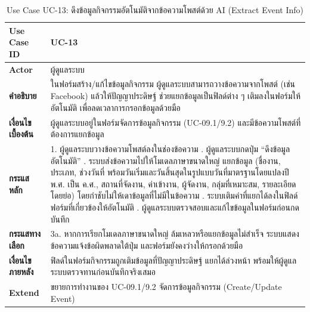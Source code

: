 \begin{table}[H]
\centering
\caption{Use Case UC-13: ดึงข้อมูลกิจกรรมอัตโนมัติจากข้อความโพสต์ด้วย AI (Extract Event Info)}
\label{tab:uc13}
\begin{tabular}{|p{3.2cm}|p{10cm}|}
\hline
\textbf{Use Case ID} & UC-13 \\ \hline
\textbf{Actor} & ผู้ดูแลระบบ \\ \hline
\textbf{คำอธิบาย} & ในฟอร์มสร้าง/แก้ไขข้อมูลกิจกรรม ผู้ดูแลระบบสามารถวางข้อความจากโพสต์ (เช่น Facebook) แล้วให้ปัญญาประดิษฐ์ ช่วยแยกข้อมูลเป็นฟิลด์ต่าง ๆ เติมลงในฟอร์มให้อัตโนมัติ เพื่อลดเวลาการกรอกข้อมูลด้วยมือ \\ \hline
\textbf{เงื่อนไขเบื้องต้น} & ผู้ดูแลระบบอยู่ในฟอร์มจัดการข้อมูลกิจกรรม (UC-09.1/9.2) และมีข้อความโพสต์ที่ต้องการแยกข้อมูล \\ \hline
\textbf{กระแสหลัก} & 1. ผู้ดูแลระบบวางข้อความโพสต์ลงในช่องข้อความ \newline 2. ผู้ดูแลระบบกดปุ่ม ``ดึงข้อมูลอัตโนมัติ'' \newline 3. ระบบส่งข้อความไปให้โมเดลภาษาขนาดใหญ่ แยกข้อมูล (ชื่องาน, ประเภท, ช่วงวันที่ พร้อมวันเริ่มและวันสิ้นสุดในรูปแบบวันที่มาตรฐานโดยแปลงปี พ.ศ. เป็น ค.ศ., สถานที่จัดงาน, ค่าเข้างาน, ผู้จัดงาน, กลุ่มที่เหมาะสม, รายละเอียดโดยย่อ) โดยกำชับไม่ให้เดาข้อมูลที่ไม่มีในข้อความ \newline 4. ระบบเติมค่าที่แยกได้ลงในฟิลด์ฟอร์มที่เกี่ยวข้องให้อัตโนมัติ \newline 5. ผู้ดูแลระบบตรวจสอบและแก้ไขข้อมูลในฟอร์มก่อนกดบันทึก \\ \hline
\textbf{กระแสทางเลือก} & 3a. หากการเรียกโมเดลภาษาขนาดใหญ่ ล้มเหลวหรือแยกข้อมูลไม่สำเร็จ ระบบแสดงข้อความแจ้งข้อผิดพลาดใต้ปุ่ม และฟอร์มยังคงว่างให้กรอกด้วยมือ \\ \hline
\textbf{เงื่อนไขภายหลัง} & ฟิลด์ในฟอร์มกิจกรรมถูกเติมข้อมูลที่ปัญญาประดิษฐ์ แยกได้ล่วงหน้า พร้อมให้ผู้ดูแลระบบตรวจทานก่อนบันทึกจริงเสมอ \\ \hline
\textbf{Extend} & ขยายการทำงานของ UC-09.1/9.2 จัดการข้อมูลกิจกรรม (Create/Update Event) \\
\hline
\end{tabular}
\end{table}

